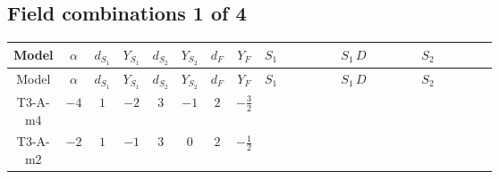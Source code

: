 \documentclass[8pt]{article}
\begin{document}
\begin{landscape}
\subsection*{Field combinations 1 of 4}
\begin{longtable}{@{}cccccccc >{\raggedright\arraybackslash}p{0.21\linewidth} >{\raggedright\arraybackslash}p{0.21\linewidth} >{\raggedright\arraybackslash}p{0.21\linewidth}@{}}
\toprule
Model & $\alpha$ & $d_{S_1}$ & $Y_{S_1}$ & $d_{S_2}$ & $Y_{S_2}$ & $d_F$ & $Y_F$ & $S_1$ & $S_1\,D$ & $S_2$ \\
\midrule
\endfirsthead
\toprule
Model & $\alpha$ & $d_{S_1}$ & $Y_{S_1}$ & $d_{S_2}$ & $Y_{S_2}$ & $d_F$ & $Y_F$ & $S_1$ & $S_1\,D$ & $S_2$ \\
\midrule
\endhead
T3-A-m4 & $-4$ & $1$ & $-2$ & $3$ & $-1$ & $2$ & $-\frac{3}{2}$ & \scriptsize\adjustbox{max width=\linewidth}{$\begin{gathered} -S_1 S_1{}^{\dagger } m_1^2 \\ +\frac{1}{2} S_1^2 \left(S_1{}^{\dagger }\right){}^2 \lambda_{S_1}^{(1)}^{(1)}\end{gathered}$} & \scriptsize\adjustbox{max width=\linewidth}{$\begin{gathered} +D_{\mu _1}\left(S_1\right){}^{\dagger } D_{\mu _1}\left(S_1\right)\end{gathered}$} & \scriptsize\adjustbox{max width=\linewidth}{$\begin{gathered} -m_2^2 S_{2,j_1} S_{2,j_1}{}^{\dagger } \\ +\frac{1}{2} S_{2,j_3} S_{2,j_4} S_{2,j_1}{}^{\dagger } S_{2,j_2}{}^{\dagger } \mathcal{I}_{S_2,j_1,j_3,j_2,j_4}{}^1 \lambda_{S_2}^{(1)}^{(1)} \\ +\frac{1}{2} S_{2,j_3} S_{2,j_4} S_{2,j_1}{}^{\dagger } S_{2,j_2}{}^{\dagger } \mathcal{I}_{S_2,j_1,j_3,j_2,j_4}{}^2 \lambda_{S_2}^{(1)}^{(2)}\end{gathered}$} \\
\midrule
T3-A-m2 & $-2$ & $1$ & $-1$ & $3$ & $0$ & $2$ & $-\frac{1}{2}$ & \scriptsize\adjustbox{max width=\linewidth}{$\begin{gathered} -S_1 S_1{}^{\dagger } m_1^2 \\ +\frac{1}{2} S_1^2 \left(S_1{}^{\dagger }\right){}^2 \lambda_{S_1}^{(1)}^{(1)}\end{gathered}$} & \scriptsize\adjustbox{max width=\linewidth}{$\begin{gathered} +D_{\mu _1}\left(S_1\right){}^{\dagger } D_{\mu _1}\left(S_1\right)\end{gathered}$} & \scriptsize\adjustbox{max width=\linewidth}{$\begin{gathered} -m_2^2 S_{2,j_1} S_{2,j_1}{}^{\dagger } \\ +\frac{1}{2} S_{2,j_3} S_{2,j_4} S_{2,j_1}{}^{\dagger } S_{2,j_2}{}^{\dagger } \mathcal{I}_{S_2,j_1,j_3,j_2,j_4}{}^1 \lambda_{S_2}^{(1)}^{(1)} \\ +\frac{1}{2} S_{2,j_3} S_{2,j_4} S_{2,j_1}{}^{\dagger } S_{2,j_2}{}^{\dagger } \mathcal{I}_{S_2,j_1,j_3,j_2,j_4}{}^2 \lambda_{S_2}^{(1)}^{(2)}\end{gathered}$} \\

\end{longtable}
\end{landscape}
\end{document}
